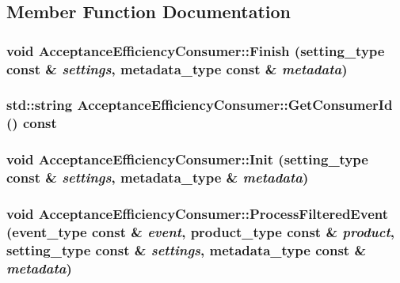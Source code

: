 \subsection{Member Function Documentation}
\hypertarget{classAcceptanceEfficiencyConsumer_a56fd2273f9d0ac8ef5bf54f6ccc8f4da}{
\subsubsection[{Finish}]{\setlength{\rightskip}{0pt plus 5cm}void AcceptanceEfficiencyConsumer::Finish (setting\_\-type const \& {\em settings}, \/  metadata\_\-type const \& {\em metadata})}}
\label{classAcceptanceEfficiencyConsumer_a56fd2273f9d0ac8ef5bf54f6ccc8f4da}
\hypertarget{classAcceptanceEfficiencyConsumer_a2e360a80f95608aa4ab46fb3bee7176b}{
\subsubsection[{GetConsumerId}]{\setlength{\rightskip}{0pt plus 5cm}std::string AcceptanceEfficiencyConsumer::GetConsumerId () const}}
\label{classAcceptanceEfficiencyConsumer_a2e360a80f95608aa4ab46fb3bee7176b}
\hypertarget{classAcceptanceEfficiencyConsumer_a94a6e5885f6c469e5c639bd6af0f5183}{
\subsubsection[{Init}]{\setlength{\rightskip}{0pt plus 5cm}void AcceptanceEfficiencyConsumer::Init (setting\_\-type const \& {\em settings}, \/  metadata\_\-type \& {\em metadata})}}
\label{classAcceptanceEfficiencyConsumer_a94a6e5885f6c469e5c639bd6af0f5183}
\hypertarget{classAcceptanceEfficiencyConsumer_ad2a504069043f69a4d1f1eefc6146b70}{
\subsubsection[{ProcessFilteredEvent}]{\setlength{\rightskip}{0pt plus 5cm}void AcceptanceEfficiencyConsumer::ProcessFilteredEvent (event\_\-type const \& {\em event}, \/  product\_\-type const \& {\em product}, \/  setting\_\-type const \& {\em settings}, \/  metadata\_\-type const \& {\em metadata})}}
